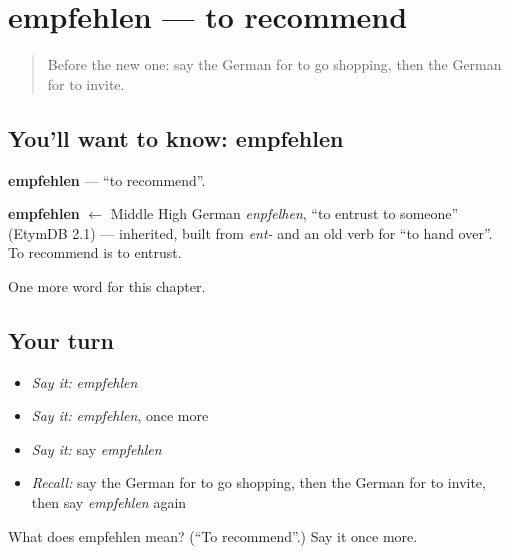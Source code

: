 \section[empfehlen]{empfehlen — to recommend}

\label{lesson:GE-C145-empfehlen}



\begin{quote}
Before the new one: say the German for to go shopping, then the German for to invite.
\end{quote}

\subsection*{You'll want to know: empfehlen}
\textbf{empfehlen} — \textquotedblleft{}to recommend\textquotedblright{}.

\begin{cousinweb}
\textbf{empfehlen} $\leftarrow$ Middle High German \emph{enpfelhen}, \textquotedblleft{}to entrust to someone\textquotedblright{} (EtymDB 2.1) — inherited, built from \emph{ent-} and an old verb for \textquotedblleft{}to hand over\textquotedblright{}. To recommend is to entrust.
\end{cousinweb}

\begin{grammarlens}[title={What you've built}]
One more word for this chapter.
\end{grammarlens}

\subsection*{Your turn}
\begin{itemize}
\raggedright
  \item \emph{Say it:} \emph{empfehlen}
  \item \emph{Say it:} \emph{empfehlen}, once more
  \item \emph{Say it:} say \emph{empfehlen}
  \item \emph{Recall:} say the German for to go shopping, then the German for to invite, then say \emph{empfehlen} again
\end{itemize}

\begin{tcolorbox}[breakable,colback=teal!4,colframe=teal!35!black,title={Before you move on}]
What does empfehlen mean? (\textquotedblleft{}To recommend\textquotedblright{}.) Say it once more.
\end{tcolorbox}
